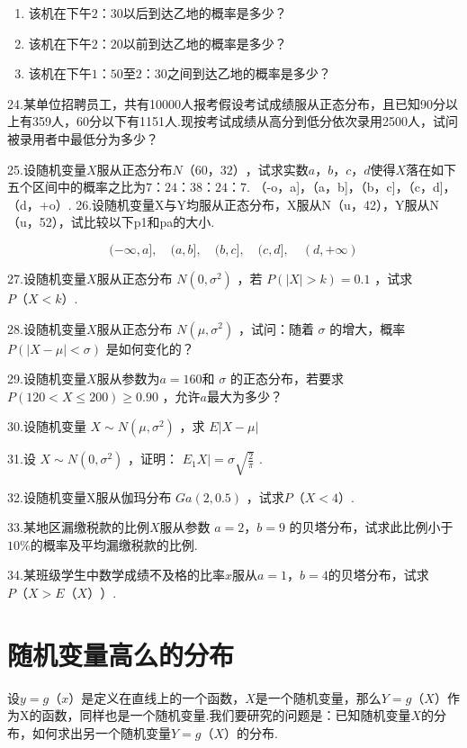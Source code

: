 \begin{enumerate}
	\item 该机在下午$ 2：30 $以后到达乙地的概率是多少？
	\item 该机在下午$ 2：20 $以前到达乙地的概率是多少？
	\item 该机在下午$ 1：50 $至$ 2：30 $之间到达乙地的概率是多少？
\end{enumerate}

24.某单位招聘员工，共有10000人报考假设考试成绩服从正态分布，且已知90分以上有359人，60分以下有1151人.现按考试成绩从高分到低分依次录用2500人，试问被录用者中最低分为多少？

25.设随机变量$ X $服从正态分布$ N（60，32） $，试求实数$ a，b，c，d $使得$ X $落在如下五个区间中的概率之比为$ 7：24：38：24：7 $.
（-o，a]，（a，b]，（b，c]，（c，d]，（d，+o）.
26.设随机变量X与Y均服从正态分布，X服从N（u，42），Y服从N（u，52），试比较以下p1和pa的大小.

\[
(-\infty, a], \quad(a, b], \quad(b, c], \quad(c, d], \quad(d,+\infty)
\]

27.设随机变量$ X $服从正态分布 $N\left(0, \sigma^{2}\right)$ ，若 $P(|X|>k)=0.1$ ，试求$ P（X<k） $.

28.设随机变量$ X $服从正态分布 $N\left(\mu, \sigma^{2}\right)$ ，试问：随着 $\sigma$ 的增大，概率 $P(|X-\mu|<\sigma)$ 是如何变化的？

29.设随机变量$ X $服从参数为$ a=160 $和 $\sigma$ 的正态分布，若要求 $P(120<X \leqslant 200) \geqslant 0.90 $ ，允许$ a $最大为多少？

30.设随机变量 $X \sim N\left(\mu, \sigma^{2}\right)$ ，求 $E | X-\mu | $ 

31.设 $X \sim N\left(0, \sigma^{2}\right)$ ，证明： $E_{1} X |=\sigma \sqrt{\frac{2}{\pi}}$ .

32.设随机变量X服从伽玛分布 $G a(2,0.5)$ ，试求$ P（X<4） $.

33.某地区漏缴税款的比例$ X $服从参数 $ a=2，b=9 $ 的贝塔分布，试求此比例小于$ 10\% $的概率及平均漏缴税款的比例.

34.某班级学生中数学成绩不及格的比率$ x $服从$ a=1，b=4 $的贝塔分布，试求$ P（X>E（X）） $.

\section{随机变量高么的分布}

设$ y=g（x） $是定义在直线上的一个函数，$ X $是一个随机变量，那么$ Y=g（X） $作为X的函数，同样也是一个随机变量.我们要研究的问题是：已知随机变量$ X $的分布，如何求出另一个随机变量$ Y=g（X） $的分布.

